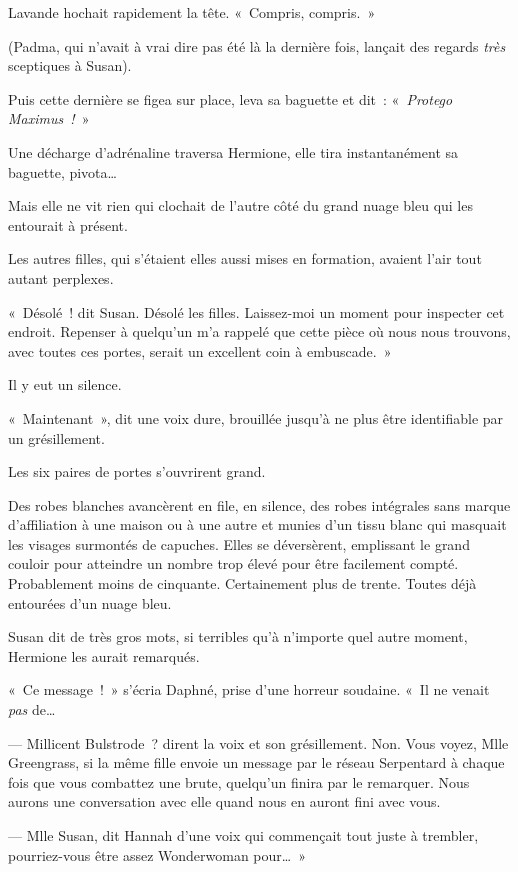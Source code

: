 Lavande hochait rapidement la tête.
«~Compris, compris.~»

(Padma, qui n'avait à vrai dire pas été là la dernière fois, lançait des regards \emph{très} sceptiques à Susan).

Puis cette dernière se figea sur place, leva sa baguette et dit~: «~\emph{Protego Maximus~!}~»

Une décharge d'adrénaline traversa Hermione, elle tira instantanément sa baguette, pivota…

Mais elle ne vit rien qui clochait de l'autre côté du grand nuage bleu qui les entourait à présent.

Les autres filles, qui s'étaient elles aussi mises en formation, avaient l'air tout autant perplexes.

«~Désolé~! dit Susan.
Désolé les filles.
Laissez-moi un moment pour inspecter cet endroit.
Repenser à quelqu'un m'a rappelé que cette pièce où nous nous trouvons, avec toutes ces portes, serait un excellent coin à embuscade.~»

Il y eut un silence.

«~Maintenant~», dit une voix dure, brouillée jusqu'à ne plus être identifiable par un grésillement.

Les six paires de portes s'ouvrirent grand.

Des robes blanches avancèrent en file, en silence, des robes intégrales sans marque d'affiliation à une maison ou à une autre et munies d'un tissu blanc qui masquait les visages surmontés de capuches.
Elles se déversèrent, emplissant le grand couloir pour atteindre un nombre trop élevé pour être facilement compté.
Probablement moins de cinquante.
Certainement plus de trente.
Toutes déjà entourées d'un nuage bleu.

Susan dit de très gros mots, si terribles qu'à n'importe quel autre moment, Hermione les aurait remarqués.

«~Ce message~!~»
s'écria Daphné, prise d'une horreur soudaine.
«~Il ne venait \emph{pas} de…

--- Millicent Bulstrode~? dirent la voix et son grésillement.
Non. Vous voyez, Mlle Greengrass, si la même fille envoie un message par le réseau Serpentard à chaque fois que vous combattez une brute, quelqu'un finira par le remarquer.
Nous aurons une conversation avec elle quand nous en auront fini avec vous.

--- Mlle Susan, dit Hannah d'une voix qui commençait tout juste à trembler, pourriez-vous être assez Wonderwoman pour…~»

